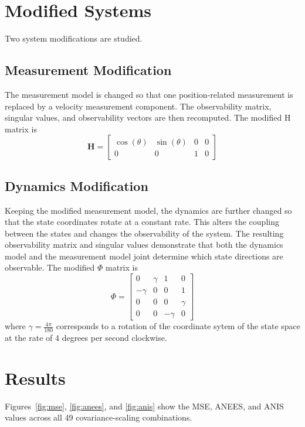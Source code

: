 \documentclass[11pt, letterpaper, twocolumn]{article}
\begin{document}
\section*{Modified Systems}

Two system modifications are studied.

\subsection*{Measurement Modification}

The measurement model is changed so that one position-related measurement is replaced
by a velocity measurement component. The observability matrix, singular values, and
observability vectors are then recomputed. The modified H matrix is
\[
\mathbf{H} = \begin{bmatrix}
    \cos(\theta) & \sin(\theta) & 0 & 0 \\
    0 & 0 & 1 & 0
\end{bmatrix}
\]

\subsection*{Dynamics Modification}

Keeping the modified measurement model, the dynamics are further changed so that the
state coordinates rotate at a constant rate. This alters the coupling between the
states and changes the observability of the system. The resulting observability
matrix and singular values demonstrate that both the dynamics model and the 
measurement model joint determine which state directions are observable.
The modified $\Phi$ matrix is
\[
\Phi = \begin{bmatrix}
    0 & \gamma & 1 & 0 \\
    -\gamma & 0 & 0 & 1 \\
    0 & 0 & 0 & \gamma \\
    0 & 0 & -\gamma & 0
\end{bmatrix}
\]
where $\gamma = \frac{4\pi}{180}$ corresponds to a rotation of the coordinate 
sytem of the state space at the rate of 4 degrees per second clockwise.

\section*{Results}

Figures~\ref{fig:mse}, \ref{fig:anees}, and \ref{fig:anis} show the MSE, ANEES,
and ANIS values across all 49 covariance-scaling combinations.
\end{document}
